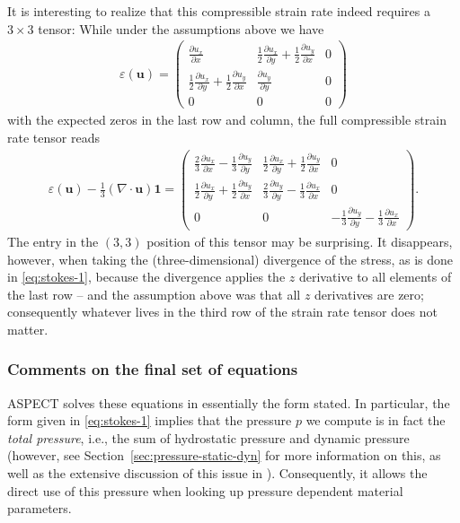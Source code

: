 \documentclass{article}
\newcommand{\aspect}{\textsc{ASPECT}}
\begin{document}
It is interesting to realize that this compressible strain rate indeed requires
a $3\times 3$ tensor: While under the assumptions above we have
\begin{align*}
  \varepsilon(\mathbf u) = 
  \begin{pmatrix}
    \tfrac{\partial u_x}{\partial x}
    &
    \tfrac 12 \tfrac{\partial u_x}{\partial y} + 
    \tfrac 12 \tfrac{\partial u_y}{\partial x}
    &
    0
    \\
    \tfrac 12 \tfrac{\partial u_x}{\partial y} + 
    \tfrac 12 \tfrac{\partial u_y}{\partial x}
    &
    \tfrac{\partial u_y}{\partial y}
    &
    0
    \\
    0 & 0 & 0
  \end{pmatrix}
\end{align*}
with the expected zeros in the last row and column, the full compressible strain
rate tensor reads
\begin{align*}
  \varepsilon(\mathbf u) - \frac{1}{3}(\nabla \cdot \mathbf u)\mathbf 1 = 
  \begin{pmatrix}
    \tfrac 23 \tfrac{\partial u_x}{\partial x}
    - \tfrac 13 \tfrac{\partial u_y}{\partial y}
    &
    \tfrac 12 \tfrac{\partial u_x}{\partial y} + 
    \tfrac 12 \tfrac{\partial u_y}{\partial x}
    &
    0
    \\
    \tfrac 12 \tfrac{\partial u_x}{\partial y} + 
    \tfrac 12 \tfrac{\partial u_y}{\partial x}
    &
    \tfrac 23 \tfrac{\partial u_y}{\partial y}
    - \tfrac 13 \tfrac{\partial u_x}{\partial x}
    &
    0
    \\
    0 & 0 &
    - \tfrac 13 \tfrac{\partial u_y}{\partial y}
    - \tfrac 13 \tfrac{\partial u_x}{\partial x}
  \end{pmatrix}.
\end{align*}
The entry in the $(3,3)$ position of this tensor may be surprising. It
disappears, however, when taking the (three-dimensional) divergence of the
stress, as is done in \eqref{eq:stokes-1}, because the divergence applies the $z$ derivative to all
elements of the last row -- and the assumption above was that all $z$
derivatives are zero; consequently whatever lives in the third row of the
strain rate tensor does not matter.



\subsubsection{Comments on the final set of equations}
\aspect{} solves these equations in essentially the form stated. In
particular, the form given in \eqref{eq:stokes-1} implies that the pressure
$p$ we compute is in fact the \textit{total pressure}, i.e., the sum of
hydrostatic pressure and dynamic pressure (however, see
Section~\ref{sec:pressure-static-dyn} for more information on this, as well as
the extensive discussion of this issue in \cite{KHB12}).
Consequently, it allows the direct use of this pressure when looking up
pressure dependent material parameters.
\end{document}
